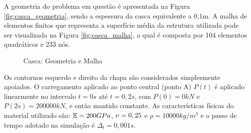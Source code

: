 A geometria do problema em questão é apresentada na Figura \ref{fig:casca_geometria}, sendo a espessura da casca equivalente a 0,1m.  A malha de elementos finitos que representa a superfície média da estrutura utilizada pode ser visualizada na Figura \ref{fig:casca_malha}, a qual é composta por 104 elementos quadráticos e 233 nós. 

\begin{figure}[!htbp]
	\caption{Casca: Geometria e Malha}
	\centering
	\label{fig:Casca}
\end{figure}

Os contornos esquerdo e direito da chapa são considerados simplesmente apoiados. O carregamento aplicado ao ponto central (ponto A) $P(t)$ é aplicado linearmente no intervalo $t=0s$ até $t=0,2s$, com $P(0)=0kN$ e $P(2s) = 200000kN$, e então mantido constante. As características físicas do material utilizado são: $\mathbb{E} = 200GPa$, $\nu = 0,25$ e $\rho = 10000 kg/m^3$ e o passo de tempo adotado na simulação é $\Delta_{t} = 0,001s$.


